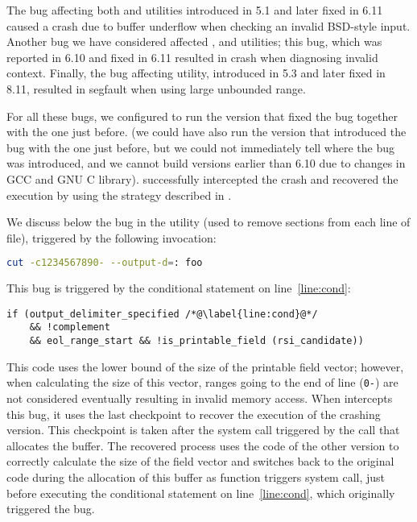 The bug affecting both \mdsum and \shasum utilities introduced in 5.1 and later
fixed in 6.11 caused a crash due to buffer underflow when checking an invalid
BSD-style input. Another bug we have considered affected \mkdir, \mkfifo and
\mknod utilities; this bug, which was reported in 6.10 and fixed in 6.11
resulted in crash when diagnosing invalid context.  Finally, the bug affecting
\cut utility, introduced in 5.3 and later fixed in 8.11, resulted in segfault
when using large unbounded range. 

For all these bugs, we configured \mx to run the version that fixed the bug
together with the one just before.  (we could have also run the version that
introduced the bug with the one just before, but we could not immediately tell
where the bug was introduced, and we cannot build versions earlier than 6.10
due to changes in GCC and GNU C library).  \mx successfully intercepted the
crash and recovered the execution by using the strategy described in
.

We discuss below the bug in the \cut utility (used to remove sections from each
line of file), triggered by the following invocation:

\begin{lstlisting}[numbers=none,breaklines=true,xleftmargin=0pt,language=bash]
cut -c1234567890- --output-d=: foo
\end{lstlisting}

This bug is triggered by the conditional statement on line~\ref{line:cond}:

\begin{lstlisting}[firstnumber=525]
if (output_delimiter_specified /*@\label{line:cond}@*/
    && !complement
    && eol_range_start && !is_printable_field (rsi_candidate))
\end{lstlisting}

This code uses the lower bound of the size of the printable field
vector; however, when calculating the size of this vector, ranges going
to the end of line (\ie \lstinline`0-`) are not considered eventually
resulting in invalid memory access. 
When \mx intercepts this bug, it uses the
last checkpoint to recover the execution of the crashing version. This
checkpoint is taken after the  system call triggered by
the  call that allocates the buffer. 
The recovered process uses the code of the other version to correctly
calculate the size of the field vector and switches back to the original
code during the allocation of this buffer as
function  triggers  system call, just
before executing the conditional statement on line~\ref{line:cond},
which originally triggered the bug.

